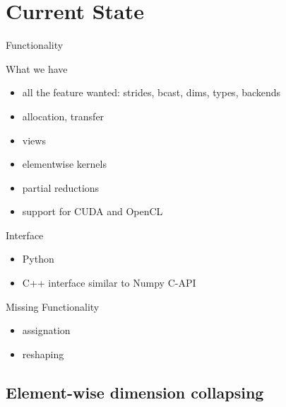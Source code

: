 \documentclass[utf8x,xcolor=pdftex,dvipsnames,table]{beamer}
\begin{document}
\section{Current State}

\begin{frame}{Functionality}
\begin{block}{What we have}
\begin{itemize}
\item all the feature wanted: strides, bcast, dims, types, backends
\item allocation, transfer
\item views
\item elementwise kernels
\item partial reductions
\item support for CUDA and OpenCL
\end{itemize}
\end{block}
\begin{block}{Interface}
\begin{itemize}
\item Python
\item C++ interface similar to Numpy C-API
\end{itemize}
\end{block}
\end{frame}

\begin{frame}{Missing Functionality}
\begin{itemize}
\item assignation
\item reshaping
\end{itemize}
\end{frame}

\subsection{Element-wise dimension collapsing}
\end{document}
